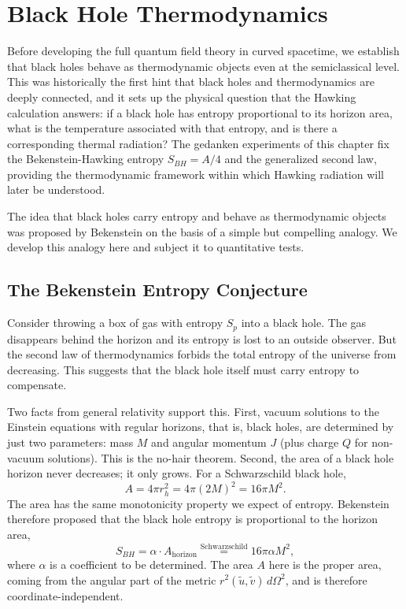 \chapter{Black Hole Thermodynamics}
\label{ch:bh-thermodynamics}
Before developing the full quantum field theory in curved spacetime,
we establish that black holes behave as thermodynamic objects even at
the semiclassical level. This was historically the first hint that
black holes and thermodynamics are deeply connected, and it sets up the
physical question that the Hawking calculation answers: if a black hole
has entropy proportional to its horizon area, what is the temperature
associated with that entropy, and is there a corresponding thermal
radiation? The gedanken experiments of this chapter fix the
Bekenstein-Hawking entropy $S_{BH} = A/4$ and the generalized second
law, providing the thermodynamic framework within which Hawking
radiation will later be understood.

The idea that black holes carry entropy and behave as thermodynamic
objects was proposed by Bekenstein on the basis of a simple but
compelling analogy. We develop this analogy here and subject it to
quantitative tests.

\section{The Bekenstein Entropy Conjecture}

Consider throwing a box of gas with entropy $S_p$ into a black hole.
The gas disappears behind the horizon and its entropy is lost to an
outside observer. But the second law of thermodynamics forbids the
total entropy of the universe from decreasing. This suggests that the
black hole itself must carry entropy to compensate.

Two facts from general relativity support this. First, vacuum solutions
to the Einstein equations with regular horizons, that is, black holes,
are determined by just two parameters: mass $M$ and angular momentum
$J$ (plus charge $Q$ for non-vacuum solutions). This is the
no-hair theorem. Second, the area of a black hole horizon never
decreases; it only grows. For a Schwarzschild black hole,
\begin{equation}
	A = 4\pi r_h^2 = 4\pi(2M)^2 = 16\pi M^2.
\end{equation}
The area has the same monotonicity property we expect of entropy.
Bekenstein therefore proposed that the black hole entropy is
proportional to the horizon area,
\begin{equation}
	S_{BH} = \alpha\cdot A_{\text{horizon}}
	\overset{\text{Schwarzschild}}{=} 16\pi\alpha M^2,
\end{equation}
where $\alpha$ is a coefficient to be determined. The area $A$ here is
the proper area, coming from the angular part of the metric
$r^2(\tilde u,\tilde v)\,d\Omega^2$, and is therefore
coordinate-independent.

